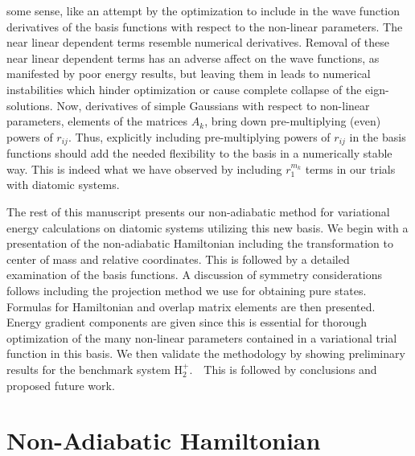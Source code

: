 \documentclass[12pt]{article}
\begin{document}
some sense, like an attempt by the optimization to include in the wave
function derivatives of the basis functions with respect to the non-linear
parameters. The near linear dependent terms resemble numerical derivatives.
Removal of these near linear dependent terms has an adverse affect on the wave
functions, as manifested by poor energy results, but leaving them in leads to
numerical instabilities which hinder optimization or cause complete collapse
of the eign-solutions. Now, derivatives of simple Gaussians with respect to
non-linear parameters, elements of the matrices $A_{k}$, bring down
pre-multiplying (even) powers of $r_{ij}$. Thus, explicitly including
pre-multiplying powers of $r_{ij}$ in the basis functions should add the
needed flexibility to the basis in a numerically stable way. This is indeed
what we have observed by including $r_{1}^{m_{k}}$ terms in our trials with
diatomic systems.

The rest of this manuscript presents our non-adiabatic method for variational
energy calculations on diatomic systems utilizing this new basis. We begin
with a presentation of the non-adiabatic Hamiltonian including the
transformation to center of mass and relative coordinates. This is followed by
a detailed examination of the basis functions. A discussion of symmetry
considerations follows including the projection method we use for obtaining
pure states. Formulas for Hamiltonian and overlap matrix elements are then
presented. Energy gradient components are given since this is essential for
thorough optimization of the many non-linear parameters contained in a
variational trial function in this basis. We then validate the methodology by
showing preliminary results for the benchmark system H$_{2}^{+}.$\ \ This is
followed by conclusions and proposed future work.

\section{Non-Adiabatic Hamiltonian}
\end{document}
